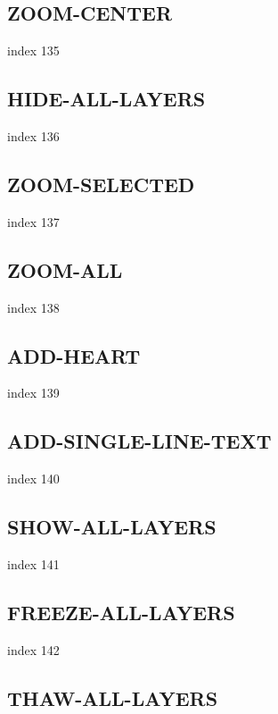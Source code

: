 \documentclass[11pt]{report}
\begin{document}
\subsection{ZOOM-CENTER}

index 135

\subsection{HIDE-ALL-LAYERS}

index 136

\subsection{ZOOM-SELECTED}

index 137

\subsection{ZOOM-ALL}

index 138

\subsection{ADD-HEART}

index 139

\subsection{ADD-SINGLE-LINE-TEXT}

index 140

\subsection{SHOW-ALL-LAYERS}

index 141

\subsection{FREEZE-ALL-LAYERS}

index 142

\subsection{THAW-ALL-LAYERS}
\end{document}
